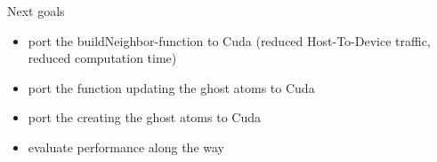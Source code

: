 \documentclass[ignorenonframetext,]{beamer}
\begin{document}
\begin{frame}[fragile]
\begin{block}{Next goals}
\begin{itemize}
\item
  port the buildNeighbor-function to Cuda (reduced Host-To-Device
  traffic, reduced computation time)
\item
  port the function updating the ghost atoms to Cuda
\item
  port the creating the ghost atoms to Cuda
\item
  evaluate performance along the way
\end{itemize}

\end{block}

\end{frame}
\end{document}
